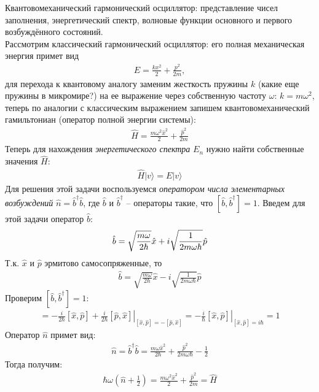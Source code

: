 \documentclass[__main__.tex]{subfiles}
\begin{document}
Квантовомеханический гармонический осциллятор: представление чисел заполнения, энергетический спектр, волновые функции основного и первого возбуждённого состояний.\\ 

Рассмотрим классический гармонический осциллятор: его полная механическая энергия примет вид
\begin{gather*}
E = \frac{kx^2}{2}+\frac{p^2}{2m},
\end{gather*}
для перехода к квантовому аналогу заменим жесткость пружины $k$ (какие еще пружины в микромире?) на ее выражение через собственную частоту $\omega$: $k=m\omega^2$, теперь по аналогии с классическим выражением запишем квантовомеханический гамильтониан (оператор полной энергии системы):
\begin{gather*}
\hat{H} = \frac{m\omega^2\hat{x}^2}{2}+\frac{\hat{p}^2}{2m}
\end{gather*}
Теперь для нахождения \textit{энергетического спектра} $E_n$ нужно найти собственные значения $\hat{H}$:
\begin{gather*}
\hat{H}|v\rangle = E|v\rangle
\end{gather*}
Для решения этой задачи воспользуемся \textit{оператором числа элементарных возбуждений} $\hat{n}=\hat{b}^\dagger\hat{b}$, где $\hat{b}$ и $\hat{b}^\dagger$ -- операторы такие, что $[\hat{b},\hat{b}^\dagger]=1$. Введем для этой задачи оператор $\hat{b}$: 
\begin{gather}
\hat{b} = \sqrt{\frac{m\omega}{2\hbar}}\hat{x} + i\sqrt{\frac{1}{2m\omega\hbar}}\hat{p}
\llabel{_10:b}
\end{gather}
Т.к. $\hat{x}$ и $\hat{p}$ эрмитово самосопряженные, то
\begin{gather*}
\hat{b} = \sqrt{\frac{m\omega}{2\hbar}}\hat{x} - i\sqrt{\frac{1}{2m\omega\hbar}}\hat{p}
\end{gather*}
Проверим $[\hat{b},\hat{b}^\dagger]=1$:
\begin{gather*}
[\hat{b},\hat{b}^\dagger]
=
\left.
-\frac{i}{2\hbar}[\hat{x},\hat{p}]+\frac{i}{2\hbar}[\hat{p},\hat{x}]
\right|_{[\hat{x},\hat{p}]=-[\hat{p},\hat{x}]}
=
\left.
-\frac{i}{\hbar}[\hat{x},\hat{p}]
\right|_{[\hat{x},\hat{p}]=i\hbar}
=
1
\end{gather*}
Оператор $\hat{n}$ примет вид:
\begin{gather*}
\hat{n}=\hat{b}^\dagger\hat{b}=\frac{m\omega\hat{x}^2}{2\hbar}+\frac{\hat{p}^2}{2m\omega\hbar}-\frac{1}{2}
\end{gather*}
Тогда получим:
\begin{gather*}
\hbar\omega\left(\hat{n}+\frac{1}{2}\right)
=
\frac{m\omega^2\hat{x}^2}{2}+\frac{\hat{p}^2}{2m}
=
\hat{H}
\end{gather*}
\end{document}
